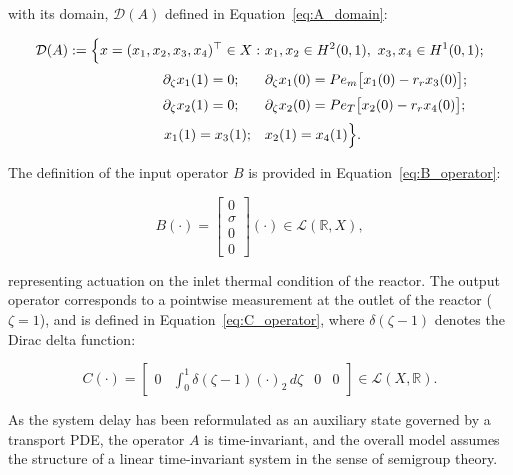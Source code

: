 with its domain, $\mathcal{D}(A)$ defined in Equation~\eqref{eq:A_domain}:

\begin{equation} \label{eq:A_domain}
\begin{aligned}
\mathcal{D}(A) := \Big\{ x = (x_1, x_2, x_3, x_4)^\top \in X :\ 
& x_1, x_2 \in H^2(0,1),\ x_3, x_4 \in H^1(0,1); \\[0.5ex]
\partial_\zeta x_1(1) = 0; \hspace{1.9em} & \partial_\zeta x_1(0) = Pe_m \bigl[ x_1(0) - r_r x_3(0) \bigr]; \\[0.5ex]
\partial_\zeta x_2(1) = 0; \hspace{1.9em} & \partial_\zeta x_2(0) = Pe_T \bigl[ x_2(0) - r_r x_4(0) \bigr]; \\[0.5ex]
x_1(1) = x_3(1); \quad & x_2(1) = x_4(1)
\Big\}.
\end{aligned}
\end{equation}

The definition of the input operator $B$ is provided in Equation~\eqref{eq:B_operator}:

\begin{equation} \label{eq:B_operator}
B (\cdot) = \begin{bmatrix} 0 \\ \sigma \\ 0 \\ 0 \end{bmatrix} (\cdot) \in \mathcal{L}(\mathbb{R}, X),
\end{equation}

representing actuation on the inlet thermal condition of the reactor. The output operator corresponds to a pointwise measurement at the outlet of the reactor ($\zeta = 1$), and is defined in Equation~\eqref{eq:C_operator}, where $\delta(\zeta - 1)$ denotes the Dirac delta function:

\begin{equation} \label{eq:C_operator}
C (\cdot) = \begin{bmatrix} 0 & \int_0^1 \delta(\zeta - 1)(\cdot)_2\, d\zeta & 0 & 0 \end{bmatrix} \in \mathcal{L}(X, \mathbb{R}).
\end{equation}

As the system delay has been reformulated as an auxiliary state governed by a transport PDE, the operator $A$ is time-invariant, and the overall model assumes the structure of a linear time-invariant system in the sense of semigroup theory.


